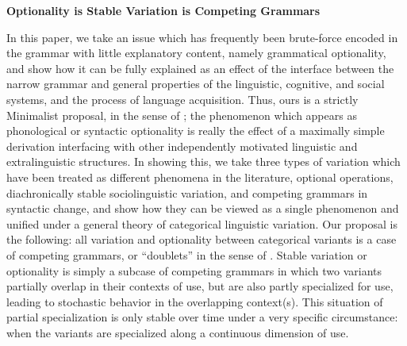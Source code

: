 \documentclass[a4paper,aps,prl,12pt,tightenlines,superscriptaddress]{revtex4}
\title{}%
\begin{document}
\begin{center} \textbf{Optionality is Stable Variation is Competing Grammars}  \end{center}


\noindent In this paper, we take an issue which has frequently been brute-force encoded in the grammar with little explanatory content, namely grammatical optionality, and show how it can be fully explained as an effect of the interface between the narrow grammar and general properties of the linguistic, cognitive, and social systems, and the process of language acquisition. 
Thus, ours is a strictly Minimalist proposal, in the sense of \citet[][and subsequent]{chomsky1993, chomsky2001}; the phenomenon which appears as phonological or syntactic optionality is really the effect of a maximally simple derivation interfacing with other independently motivated linguistic and extralinguistic structures. In showing this, we take three types of variation which have been treated as different phenomena in the literature, optional operations, diachronically stable sociolinguistic variation, and competing grammars in syntactic change, and show how they can be viewed as a single phenomenon and unified under a general theory of categorical linguistic variation. 
Our proposal is the following: all variation and optionality between categorical variants is a case of competing grammars, or ``doublets'' in the sense of \citet{kroch1994}. 
Stable variation or optionality is simply a subcase of competing grammars in which two variants partially overlap in their contexts of use, but are also partly specialized for use, leading to stochastic behavior in the overlapping context(s). 
This situation of partial specialization is only stable over time under a very specific circumstance: when the variants are specialized along a continuous dimension of use.%
\end{document}
